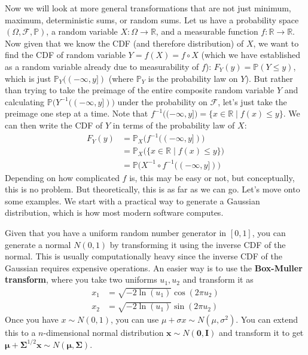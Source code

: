 \documentclass{article}
\begin{document}
      Now we will look at more general transformations that are not just minimum, maximum, deterministic sums, or random sums. Let us have a probability space $(\Omega, \mathcal{F}, \mathbb{P})$, a random variable $X: \Omega \rightarrow \mathbb{R}$, and a measurable function $f: \mathbb{R} \rightarrow \mathbb{R}$. Now given that we know the CDF (and therefore distribution) of $X$, we want to find the CDF of random variable $Y = f(X) = f \circ X$ (which we have established as a random variable already due to measurability of $f$): $F_Y (y) = \mathbb{P}(Y \leq y)$, which is just $\mathbb{P}_Y ((-\infty, y])$ (where $\mathbb{P}_Y$ is the probability law on $Y$). But rather than trying to take the preimage of the entire composite random variable $Y$ and calculating $\mathbb{P}\big( Y^{-1}((-\infty, y]) \big)$ under the probability on $\mathcal{F}$, let's just take the preimage one step at a time. Note that $f^{-1} \big( (-\infty, y] \big) = \{x \in \mathbb{R} \mid f(x) \leq y\}$. We can then write the CDF of $Y$ in terms of the probability law of $X$: 
      \begin{align*}
        F_Y (y) & = \mathbb{P}_X \big( f^{-1} ((-\infty, y]) \big) \\
        & = \mathbb{P}_X \big( \{x \in \mathbb{R} \mid f(x) \leq y\} \big) \\
        & = \mathbb{P} \big( X^{-1} \circ f^{-1} ((-\infty, y]) \big) 
      \end{align*}
      Depending on how complicated $f$ is, this may be easy or not, but conceptually, this is no problem. But theoretically, this is as far as we can go. Let's move onto some examples. We start with a practical way to generate a Gaussian distribution, which is how most modern software computes. 

      \begin{example}
        Given that you have a uniform random number generator in $[0, 1]$, you can generate a normal $N(0, 1)$ by transforming it using the inverse CDF of the normal. This is usually computationally heavy since the inverse CDF of the Gaussian requires expensive operations. An easier way is to use the \textbf{Box-Muller transform}, where you take two uniforms $u_1, u_2$ and transform it as 
        \begin{align*}
            x_1 & = \sqrt{-2 \ln(u_1)} \cos(2 \pi u_2) \\
            x_2 & = \sqrt{-2 \ln(u_1)} \sin(2 \pi u_2)
        \end{align*}
        Once you have $x \sim N(0, 1)$, you can use $\mu + \sigma x \sim N(\mu, \sigma^2)$. You can extend this to a $n$-dimensional normal distribution $\mathbf{x} \sim N(\mathbf{0}, \mathbf{I})$ and transform it to get $\boldsymbol{\mu} + \boldsymbol{\Sigma}^{1/2} \mathbf{x} \sim N(\boldsymbol{\mu}, \boldsymbol{\Sigma})$. 
      \end{example}
\end{document}
